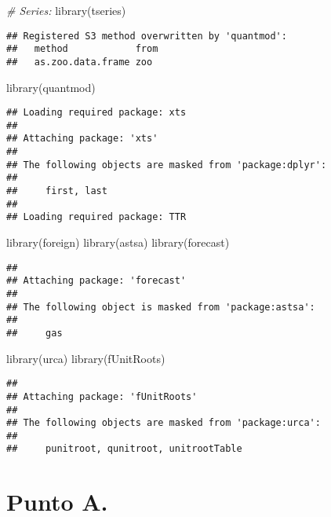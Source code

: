 \documentclass[
]{article}
\newenvironment{Shaded}{\begin{snugshade}}{\end{snugshade}}
\newcommand{\CommentTok}[1]{\textcolor[rgb]{0.56,0.35,0.01}{\textit{#1}}}
\newcommand{\FunctionTok}[1]{\textcolor[rgb]{0.00,0.00,0.00}{#1}}
\newcommand{\NormalTok}[1]{#1}
\begin{document}
\begin{Shaded}
\begin{Highlighting}[]
\CommentTok{\# Series: }
\FunctionTok{library}\NormalTok{(tseries)}
\end{Highlighting}
\end{Shaded}

\begin{verbatim}
## Registered S3 method overwritten by 'quantmod':
##   method            from
##   as.zoo.data.frame zoo
\end{verbatim}

\begin{Shaded}
\begin{Highlighting}[]
\FunctionTok{library}\NormalTok{(quantmod)}
\end{Highlighting}
\end{Shaded}

\begin{verbatim}
## Loading required package: xts
## 
## Attaching package: 'xts'
## 
## The following objects are masked from 'package:dplyr':
## 
##     first, last
## 
## Loading required package: TTR
\end{verbatim}

\begin{Shaded}
\begin{Highlighting}[]
\FunctionTok{library}\NormalTok{(foreign)}
\FunctionTok{library}\NormalTok{(astsa)}
\FunctionTok{library}\NormalTok{(forecast)}
\end{Highlighting}
\end{Shaded}

\begin{verbatim}
## 
## Attaching package: 'forecast'
## 
## The following object is masked from 'package:astsa':
## 
##     gas
\end{verbatim}

\begin{Shaded}
\begin{Highlighting}[]
\FunctionTok{library}\NormalTok{(urca)}
\FunctionTok{library}\NormalTok{(fUnitRoots)}
\end{Highlighting}
\end{Shaded}

\begin{verbatim}
## 
## Attaching package: 'fUnitRoots'
## 
## The following objects are masked from 'package:urca':
## 
##     punitroot, qunitroot, unitrootTable
\end{verbatim}

\hypertarget{punto-a.}{%
\section{Punto A.}\label{punto-a.}}
\end{document}
